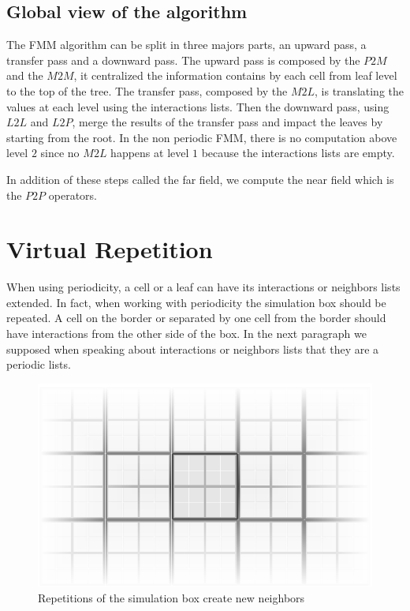 \documentclass[12pt]{article} %
\begin{document}
\subsection{Global view of the algorithm}
The FMM algorithm can be split in three majors parts, an upward pass, a transfer pass and a downward pass.
The upward pass is composed by the $P2M$ and the $M2M$, it centralized the information contains by each cell from leaf level to the top of the tree.
The transfer pass, composed by the $M2L$, is translating the values at each level using the interactions lists.
Then the downward pass, using $L2L$ and $L2P$, merge the results of the transfer pass and impact the leaves by starting from the root.
In the non periodic FMM, there is no computation above level $2$ since no $M2L$ happens at level $1$ because the interactions lists are empty.

In addition of these steps called the far field, we compute the near field which is the $P2P$ operators.


\section{Virtual Repetition}

When using periodicity, a cell or a leaf can have its interactions or neighbors lists extended.
In fact, when working with periodicity the simulation box should be repeated.
A cell on the border or separated by one cell from the border should have interactions from the other side of the box.
In the next paragraph we supposed when speaking about interactions or neighbors lists that they are a periodic lists.

\begin{figure}[h]
\centering
\includegraphics[scale=0.6]{Images/Repetitions}
\caption{Repetitions of the simulation box create new neighbors}
\end{figure}
\end{document}
